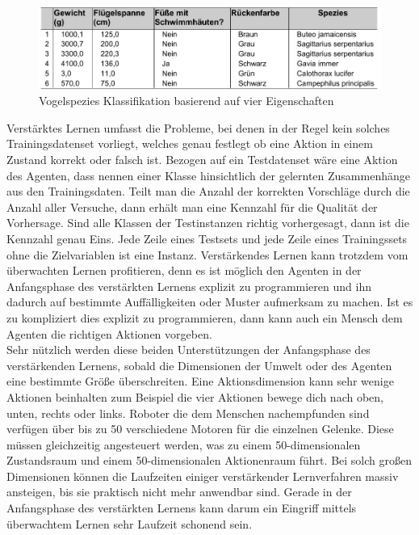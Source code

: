 \begin{figure}[!htbp]
  \centering
  \includegraphics[scale = 0.89]{inhalt/abbildungen/vogel_spezies.pdf}
  \caption{Vogelspezies Klassifikation basierend auf vier Eigenschaften}
  \label{fig:vogel_spezies}
\end{figure} 

Verstärktes Lernen umfasst die Probleme, bei denen in der Regel kein solches Trainingsdatenset vorliegt, welches genau festlegt ob eine Aktion in einem Zustand korrekt oder falsch ist. Bezogen auf ein Testdatenset wäre eine Aktion des Agenten, dass nennen einer Klasse hinsichtlich der gelernten Zusammenhänge aus den Trainingsdaten. Teilt man die Anzahl der korrekten Vorschläge durch die Anzahl aller Versuche, dann erhält man eine Kennzahl für die Qualität der Vorhersage. Sind alle Klassen der Testinstanzen richtig vorhergesagt, dann ist die Kennzahl genau Eins. Jede Zeile eines Testsets und jede Zeile eines Trainingssets ohne die Zielvariablen ist eine Instanz. Verstärkendes Lernen kann trotzdem vom überwachten Lernen profitieren, denn es ist möglich den Agenten in der Anfangsphase des verstärkten Lernens explizit zu programmieren und ihn dadurch auf bestimmte Auffälligkeiten oder Muster aufmerksam zu machen. Ist es zu kompliziert dies explizit zu programmieren, dann kann auch ein Mensch dem Agenten die richtigen Aktionen vorgeben. \\

Sehr nützlich werden diese beiden Unterstützungen der Anfangsphase des verstärkenden Lernens, sobald die Dimensionen der Umwelt oder des Agenten eine bestimmte Größe überschreiten. Eine Aktionsdimension kann sehr wenige Aktionen beinhalten zum Beispiel die vier Aktionen bewege dich nach oben, unten, rechts oder links. Roboter die dem Menschen nachempfunden sind verfügen über bis zu 50 verschiedene Motoren für die einzelnen Gelenke. Diese müssen gleichzeitig angesteuert werden, was zu einem 50-dimensionalen Zustandsraum und einem 50-dimensionalen Aktionenraum führt\cite[\acs{vgl.} 305\psq]{Ertel}. Bei solch großen Dimensionen können die Laufzeiten einiger verstärkender Lernverfahren massiv ansteigen, bis sie praktisch nicht mehr anwendbar sind. Gerade in der Anfangsphase des verstärkten Lernens kann darum ein Eingriff mittels überwachtem Lernen sehr Laufzeit schonend sein.


